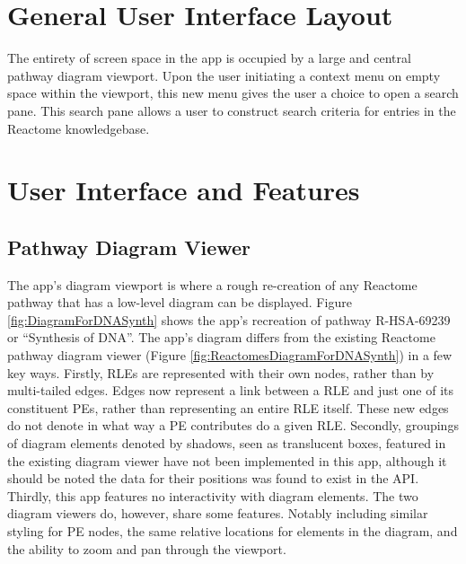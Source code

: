 \documentclass[12pt, letterpaper]{report}
\begin{document}
\section {General User Interface Layout}
The entirety of screen space in the app is occupied by a large and central pathway diagram viewport. Upon the user initiating a context menu on empty space within the viewport, this new menu gives the user a choice to open a search pane. This search pane allows a user to construct search criteria for entries in the Reactome knowledgebase.

\section {User Interface and Features}

\subsection{Pathway Diagram Viewer}
The app's diagram viewport is where a rough re-creation of any Reactome pathway that has a low-level diagram can be displayed. Figure \ref{fig:DiagramForDNASynth} shows the app's recreation of pathway R-HSA-69239 or ``Synthesis of DNA''. The app's diagram differs from the existing Reactome pathway diagram viewer (Figure \ref{fig:ReactomesDiagramForDNASynth}) in a few key ways. Firstly, RLEs are represented with their own nodes, rather than by multi-tailed edges. Edges now represent a link between a RLE and just one of its constituent PEs, rather than representing an entire RLE itself. These new edges do not denote in what way a PE contributes do a given RLE. Secondly, groupings of diagram elements denoted by shadows, seen as translucent boxes, featured in the existing diagram viewer have not been implemented in this app, although it should be noted the data for their positions was found to exist in the API. Thirdly, this app features no interactivity with diagram elements. The two diagram viewers do, however, share some features. Notably including similar styling for PE nodes, the same relative locations for elements in the diagram, and the ability to zoom and pan through the viewport.
\newpage
\end{document}
